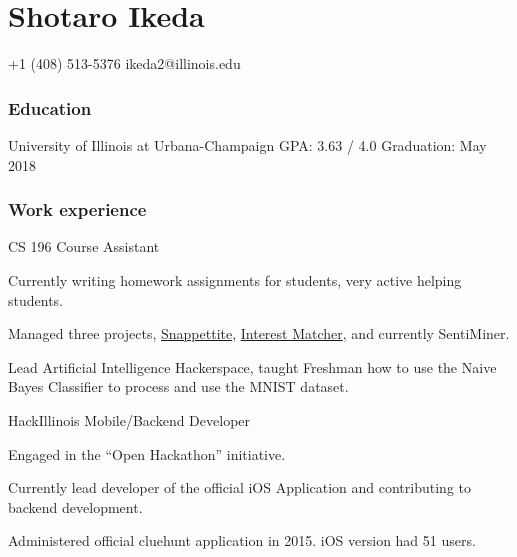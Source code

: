 \documentclass{tccv}
\newenvironment{itemize*}%
{\begin{itemize}%
    \vspace{-0.7em}
    \setlength{\itemsep}{0pt}%
    \setlength{\parskip}{0pt}}%
  {\end{itemize}}
\begin{document}
\part{Shotaro Ikeda}

{+1 (408) 513-5376}
{ikeda2@illinois.edu}

\section{Education}

\begin{yearlist}

  {University of Illinois at  \newline Urbana-Champaign}
  {GPA: 3.63 / 4.0}
  {Graduation: May 2018}

\end{yearlist}

\section{Work experience}

\begin{eventlist}

  {CS 196}
  {Course Assistant}

  \begin{itemize*}
  \item Currently writing homework assignments for students, very active helping students.
  \item Managed three projects, \href{https://github.com/SNAPPETITE}{Snappettite}, \href{https://github.com/InterestMatcher}{Interest Matcher}, and currently SentiMiner.
  \item Lead Artificial Intelligence Hackerspace, taught Freshman how to use the Naive Bayes Classifier to process and use the MNIST dataset.
  \end{itemize*}

  {HackIllinois}
  {Mobile/Backend Developer}
  \begin{itemize*}
  \item Engaged in the ``Open Hackathon'' initiative.
  \item Currently lead developer of the official iOS Application and contributing to \\
    backend development.
  \item Administered official cluehunt application in 2015. iOS version had 51 users.
  \end{itemize*}

\end{eventlist}
\end{document}

